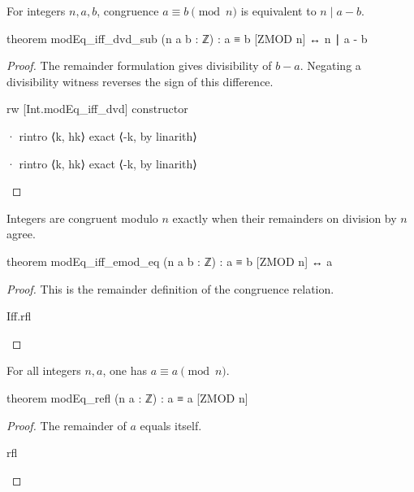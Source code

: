 \begin{theorem}
  \label{ent:thm:modeq-iff-dvd-sub}
  For integers $n,a,b$, congruence $a\equiv b\pmod n$ is equivalent to $n\mid a-b$.

  \begin{lean}
    theorem modEq_iff_dvd_sub (n a b : ℤ) : a ≡ b [ZMOD n] ↔ n ∣ a - b
  \end{lean}
\end{theorem}

\begin{proof}
  The remainder formulation gives divisibility of $b-a$.
  Negating a divisibility witness reverses the sign of this difference.

  \begin{lean}
    rw [Int.modEq_iff_dvd]
    constructor

    · rintro ⟨k, hk⟩
      exact ⟨-k, by linarith⟩

    · rintro ⟨k, hk⟩
      exact ⟨-k, by linarith⟩
  \end{lean}
\end{proof}

\begin{theorem}
  \label{ent:thm:modeq-iff-emod-eq}
  Integers are congruent modulo $n$ exactly when their remainders on division by $n$ agree.

  \begin{lean}
    theorem modEq_iff_emod_eq (n a b : ℤ) : a ≡ b [ZMOD n] ↔ a %
  \end{lean}
\end{theorem}

\begin{proof}
  This is the remainder definition of the congruence relation.

  \begin{lean}
    Iff.rfl
  \end{lean}
\end{proof}

\begin{theorem}
  \label{ent:thm:modeq-refl}
  For all integers $n,a$, one has $a\equiv a\pmod n$.

  \begin{lean}
    theorem modEq_refl (n a : ℤ) : a ≡ a [ZMOD n]
  \end{lean}
\end{theorem}

\begin{proof}
  The remainder of $a$ equals itself.

  \begin{lean}
    rfl
  \end{lean}
\end{proof}

